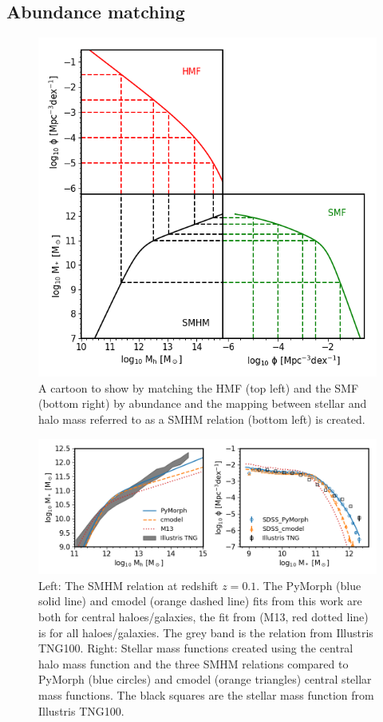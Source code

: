 \subsection{Abundance matching}
\label{C2:SubSec:AbnMtch}
\begin{figure}[h]
	\centering
	\includegraphics[width = \linewidth]{Figures/Chapter2/AbundaceMatching.png}
    \caption{A cartoon to show by matching the HMF (top left) and the SMF (bottom right) by abundance and the mapping between stellar and halo mass referred to as a SMHM relation (bottom left) is created.}
	\label{fig:Abn_Toon}
\end{figure}

\begin{figure}[h]
	\centering
	\includegraphics[width = \linewidth]{Figures/Chapter2/AbundaceMtch_Data.png}
    \caption{Left: The SMHM relation at redshift $z=0.1$. The PyMorph (blue solid line) and cmodel (orange dashed line) fits from this work are both for central haloes/galaxies, the fit from \citet{Moster2013} (M13, red dotted line) is for all haloes/galaxies. The grey band is the relation from Illustris TNG100. Right: Stellar mass functions created using the central halo mass function and the three SMHM relations compared to PyMorph (blue circles) and cmodel (orange triangles) central stellar mass functions. The black squares are the stellar mass function from Illustris TNG100.}
	\label{fig:Abn_Data}
\end{figure}

